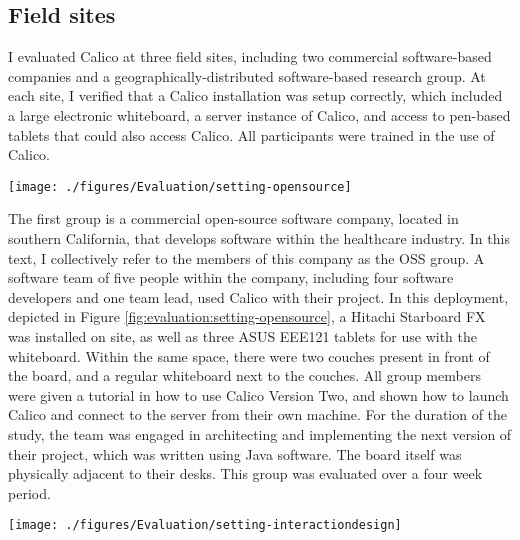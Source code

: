 \subsection{Field sites}

I evaluated Calico at three field sites, including two commercial software-based companies and a geographically-distributed software-based research group. At each site, I verified that a Calico installation was setup correctly, which included a large electronic whiteboard, a server instance of Calico, and access to pen-based tablets that could also access Calico. All participants were trained in the use of Calico.

\begin{figure*}[tbh]
  \centering
  \texttt{[image: ./figures/Evaluation/setting-opensource]}
  \caption{The physical setup at the commercial OSS company}
  \label{fig:evaluation:setting-opensource}
\end{figure*}

The first group is a commercial open-source software company, located in southern California, that develops software within the healthcare industry. In this text, I collectively refer to the members of this company as the OSS group. A software team of five people within the company, including four software developers and one team lead, used Calico with their project. In this deployment, depicted in Figure \ref{fig:evaluation:setting-opensource}, a Hitachi Starboard FX was installed on site, as well as three ASUS EEE121 tablets for use with the whiteboard. Within the same space, there were two couches present in front of the board, and a regular whiteboard next to the couches. All group members were given a tutorial in how to use Calico Version Two, and shown how to launch Calico and connect to the server from their own machine.  For the duration of the study, the team was engaged in architecting and implementing the next version of their project, which was written using Java software. The board itself was physically adjacent to their desks. This group was evaluated over a four week period.

\begin{figure*}[tbh]
  \centering
  \texttt{[image: ./figures/Evaluation/setting-interactiondesign]}
  \caption{TODO: HAVE JIM APPROVE IMAGE A tutorial of the usage of Calico given to the interaction design group}
  \label{fig:evaluation:setting-interactiondesign}
\end{figure*}

